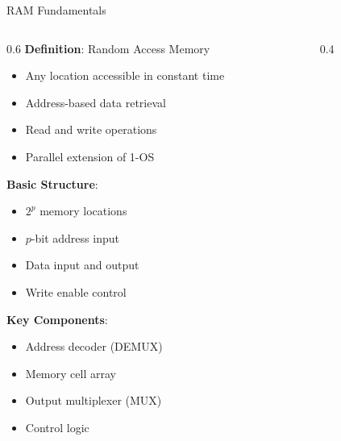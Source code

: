 \documentclass[aspectratio=169,11pt]{beamer}
\newcommand{\concept}[1]{\textbf{\color{accentcolor}#1}}
\begin{document}
\begin{frame}{RAM Fundamentals}
\begin{columns}
\begin{column}{0.6\textwidth}
\concept{Definition}: Random Access Memory
\begin{itemize}
\item Any location accessible in constant time
\item Address-based data retrieval
\item Read and write operations
\item Parallel extension of 1-OS
\end{itemize}
\vspace{0.3cm}
\concept{Basic Structure}:
\begin{itemize}
\item $2^p$ memory locations
\item $p$-bit address input
\item Data input and output
\item Write enable control
\end{itemize}
\vspace{0.3cm}
\concept{Key Components}:
\begin{itemize}
\item Address decoder (DEMUX)
\item Memory cell array
\item Output multiplexer (MUX)
\item Control logic
\end{itemize}
\end{column}
\begin{column}{0.4\textwidth}
\begin{center}

\end{center}
\end{column}
\end{columns}
\end{frame}
\end{document}
